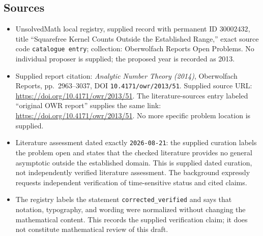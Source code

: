 \documentclass[11pt]{article}
\begin{document}
\subsection{Sources}
\begin{itemize}
\item UnsolvedMath local registry, supplied record with permanent ID \(30002432\), title ``Squarefree Kernel Counts Outside the Established Range,'' exact source code \texttt{catalogue entry}; collection: Oberwolfach Reports Open Problems. No individual proposer is supplied; the proposed year is recorded as 2013.
\item Supplied report citation: \emph{Analytic Number Theory (2014)}, Oberwolfach Reports, pp.~2963--3037, DOI \texttt{10.4171/owr/2013/51}. Supplied source URL: \url{https://doi.org/10.4171/owr/2013/51}. The literature-sources entry labeled ``original OWR report'' supplies the same link: \url{https://doi.org/10.4171/owr/2013/51}. No more specific problem location is supplied.
\item Literature assessment dated exactly \texttt{2026-08-21}: the supplied curation labels the problem open and states that the checked literature provides no general asymptotic outside the established domain. This is supplied dated curation, not independently verified literature assessment. The background expressly requests independent verification of time-sensitive status and cited claims.
\item The registry labels the statement \texttt{corrected\_verified} and says that notation, typography, and wording were normalized without changing the mathematical content. This records the supplied verification claim; it does not constitute mathematical review of this draft.
\end{itemize}
\end{document}
